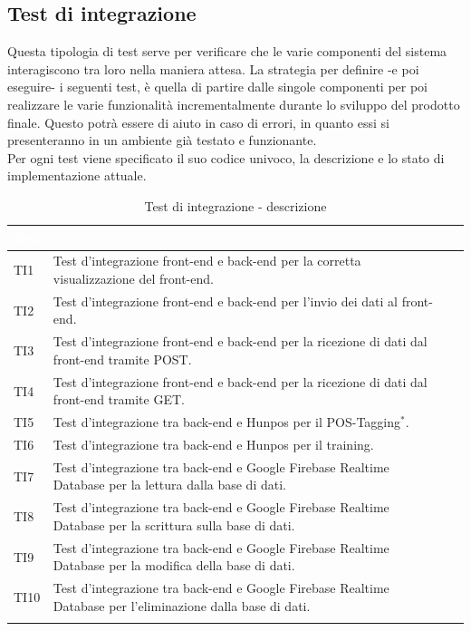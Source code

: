\subsection{Test di integrazione}
Questa tipologia di test serve per verificare che le varie componenti del sistema interagiscono tra loro nella maniera attesa. La strategia per definire -e poi eseguire- i seguenti test, è quella di partire dalle singole componenti per poi realizzare le varie funzionalità incrementalmente durante lo sviluppo del prodotto finale. Questo potrà essere di aiuto in caso di errori, in quanto essi si presenteranno in un ambiente già testato e funzionante. \\
Per ogni test viene specificato il suo codice univoco, la descrizione e lo stato di implementazione attuale.

	\begin{longtable}{|>{\centering\arraybackslash}m{1.6cm}|>{\centering\arraybackslash}m{6.41cm}|>{\centering\arraybackslash}m{3.1cm}|}		
		\rowcolor{LightBlue}
		\textbf{\textcolor{white}{Test}}
		& \multicolumn{1}{|c|}{\textbf{\textcolor{white}{ Descrizione}}}\\
		\hline
		TI1
		& Test d’integrazione front-end e back-end per la corretta visualizzazione del front-end.
		\\ \hline
		\rowcolor{LightGray}
		TI2
		& Test d’integrazione front-end e back-end per l'invio dei dati al front-end.
		\\ \hline
		TI3
		& Test d’integrazione front-end e back-end per la ricezione di dati dal front-end tramite POST.
		\\ \hline
		\rowcolor{LightGray}
		TI4
		& Test d’integrazione front-end e back-end per la ricezione di dati dal front-end tramite GET.
		\\ \hline
		TI5
		& Test d’integrazione tra back-end e Hunpos per il POS-Tagging$^*$.
		\\ \hline
		\rowcolor{LightGray}
		TI6
		& Test d’integrazione tra back-end e Hunpos per il training.
		\\ \hline	
		TI7
		& Test d’integrazione tra back-end e Google Firebase Realtime Database per la lettura dalla base di dati.
		\\ \hline	
		\rowcolor{LightGray}
		TI8
		& Test d’integrazione tra back-end e Google Firebase Realtime Database per la scrittura sulla base di dati.
		\\ \hline	
		TI9
		& Test d’integrazione tra back-end e Google Firebase Realtime Database per la modifica della base di dati.
		\\ \hline	
		\rowcolor{LightGray}
		TI10
		& Test d’integrazione tra back-end e Google Firebase Realtime Database per l'eliminazione dalla base di dati.
		\\ \hline	
		\caption{Test di integrazione - descrizione}
\end{longtable}


